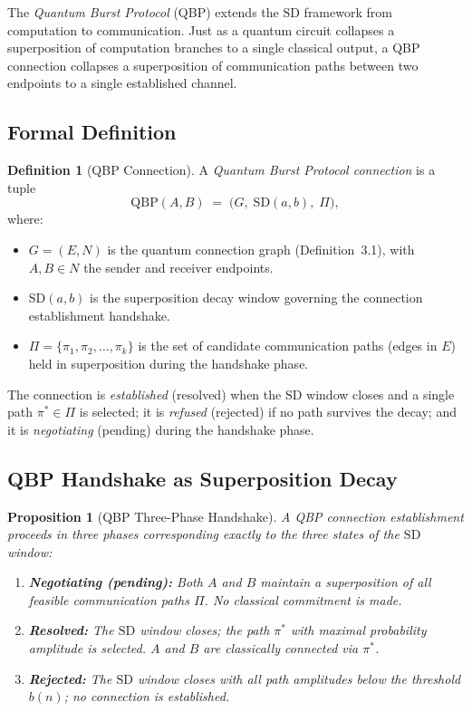 \documentclass[11pt]{article}
\theoremstyle{plain}
\newtheorem{proposition}[theorem]{Proposition}
\theoremstyle{definition}
\newtheorem{definition}[theorem]{Definition}
\theoremstyle{remark}
\newcommand{\SD}{\ensuremath{\mathrm{SD}}}   %
\begin{document}
The \emph{Quantum Burst Protocol} (QBP) extends the \SD{} framework from
computation to communication.  Just as a quantum circuit collapses a
superposition of computation branches to a single classical output, a QBP
connection collapses a superposition of communication paths between two
endpoints to a single established channel.

\subsection{Formal Definition}

\begin{definition}[QBP Connection]
  A \emph{Quantum Burst Protocol connection} is a tuple
  \[
    \mathrm{QBP}(A, B) \;=\; \bigl(G,\; \SD(a,b),\; \Pi \bigr),
  \]
  where:
  \begin{itemize}
    \item $G = (E, N)$ is the quantum connection graph (Definition~3.1),
          with $A, B \in N$ the sender and receiver endpoints.
    \item $\SD(a,b)$ is the superposition decay window governing the
          connection establishment handshake.
    \item $\Pi = \{\pi_1, \pi_2, \ldots, \pi_k\}$ is the set of candidate
          communication paths (edges in $E$) held in superposition during
          the handshake phase.
  \end{itemize}
  The connection is \emph{established} (resolved) when the \SD{} window
  closes and a single path $\pi^* \in \Pi$ is selected; it is
  \emph{refused} (rejected) if no path survives the decay; and it is
  \emph{negotiating} (pending) during the handshake phase.
\end{definition}

\subsection{QBP Handshake as Superposition Decay}

\begin{proposition}[QBP Three-Phase Handshake]
  A QBP connection establishment proceeds in three phases corresponding
  exactly to the three states of the \SD{} window:
  \begin{enumerate}
    \item \textbf{Negotiating (pending):}  Both $A$ and $B$ maintain a
          superposition of all feasible communication paths $\Pi$.  No
          classical commitment is made.
    \item \textbf{Resolved:}  The \SD{} window closes; the path $\pi^*$
          with maximal probability amplitude is selected.  $A$ and $B$
          are classically connected via $\pi^*$.
    \item \textbf{Rejected:}  The \SD{} window closes with all path
          amplitudes below the threshold $b(n)$; no connection is established.
  \end{enumerate}
\end{proposition}
\end{document}
